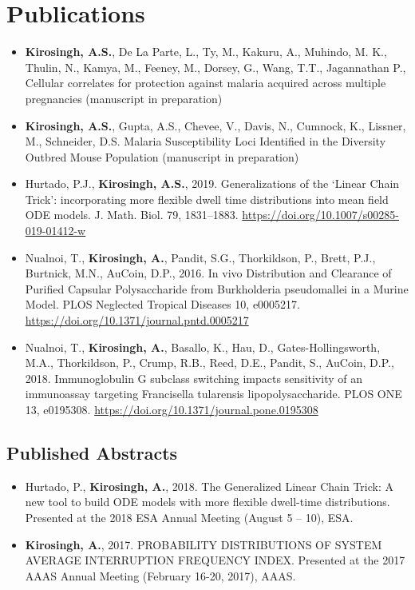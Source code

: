\documentclass[11pt,a4paper,]{awesome-cv}
\begin{document}
\hypertarget{publications}{%
\section{Publications}\label{publications}}

\begin{itemize}
\item
  \textbf{Kirosingh, A.S.}, De La Parte, L., Ty, M., Kakuru, A.,
  Muhindo, M. K., Thulin, N., Kamya, M., Feeney, M., Dorsey, G., Wang,
  T.T., Jagannathan P., Cellular correlates for protection against
  malaria acquired across multiple pregnancies (manuscript in
  preparation)
\item
  \textbf{Kirosingh, A.S.}, Gupta, A.S., Chevee, V., Davis, N., Cumnock,
  K., Lissner, M., Schneider, D.S. Malaria Susceptibility Loci
  Identified in the Diversity Outbred Mouse Population (manuscript in
  preparation)
\item
  Hurtado, P.J., \textbf{Kirosingh, A.S.}, 2019. Generalizations of the
  `Linear Chain Trick': incorporating more flexible dwell time
  distributions into mean field ODE models. J. Math. Biol. 79,
  1831--1883. \url{https://doi.org/10.1007/s00285-019-01412-w}
\item
  Nualnoi, T., \textbf{Kirosingh, A.}, Pandit, S.G., Thorkildson, P.,
  Brett, P.J., Burtnick, M.N., AuCoin, D.P., 2016. In vivo Distribution
  and Clearance of Purified Capsular Polysaccharide from Burkholderia
  pseudomallei in a Murine Model. PLOS Neglected Tropical Diseases 10,
  e0005217. \url{https://doi.org/10.1371/journal.pntd.0005217}
\item
  Nualnoi, T., \textbf{Kirosingh, A.}, Basallo, K., Hau, D.,
  Gates-Hollingsworth, M.A., Thorkildson, P., Crump, R.B., Reed, D.E.,
  Pandit, S., AuCoin, D.P., 2018. Immunoglobulin G subclass switching
  impacts sensitivity of an immunoassay targeting Francisella tularensis
  lipopolysaccharide. PLOS ONE 13, e0195308.
  \url{https://doi.org/10.1371/journal.pone.0195308}
\end{itemize}

\hypertarget{published-abstracts}{%
\subsection{Published Abstracts}\label{published-abstracts}}

\begin{itemize}
\item
  Hurtado, P., \textbf{Kirosingh, A.}, 2018. The Generalized Linear
  Chain Trick: A new tool to build ODE models with more flexible
  dwell-time distributions. Presented at the 2018 ESA Annual Meeting
  (August 5 -- 10), ESA.
\item
  \textbf{Kirosingh, A.}, 2017. PROBABILITY DISTRIBUTIONS OF SYSTEM
  AVERAGE INTERRUPTION FREQUENCY INDEX. Presented at the 2017 AAAS
  Annual Meeting (February 16-20, 2017), AAAS.
\end{itemize}
\end{document}
